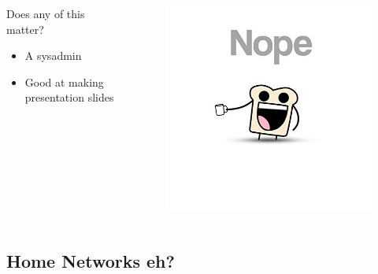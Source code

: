 \documentclass{beamer}
\begin{document}
\begin{frame}
    \begin{columns}
        \begin{column}{0.5\textwidth}
            Does any of this matter?
            \begin{itemize}
                \item A sysadmin
                \item Good at making presentation slides
            \end{itemize}
        \end{column}
        \begin{column}{0.5\textwidth}
            \begin{figure}
                \centering
                \includegraphics[width=1\textwidth,keepaspectratio]{../resources/nope.jpg}
            \end{figure}
        \end{column}
    \end{columns}
\end{frame}

\subsection{Home Networks eh?}
\end{document}
